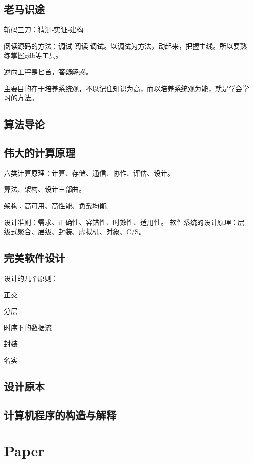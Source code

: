 \subsection{老马识途}

斩码三刀：猜测-实证-建构

阅读源码的方法：调试-阅读-调试。以调试为方法，动起来，把握主线。所以要熟练掌握gdb等工具。

逆向工程是匕首，答疑解惑。

主要目的在于培养系统观，不以记住知识为高，而以培养系统观为能，就是学会学习的方法。

\subsection{算法导论}

\subsection{伟大的计算原理}

六类计算原理：计算、存储、通信、协作、评估、设计。

算法、架构、设计三部曲。

架构：高可用、高性能、负载均衡。

设计准则：需求、正确性、容错性、时效性、适用性。
软件系统的设计原理：层级式聚合、层级、封装、虚拟机、对象、C/S。

\subsection{完美软件设计}

设计的几个原则：
\begin{enumbox}
\item 正交
\item 分层
\item 时序下的数据流
\item 封装
\item 名实
\end{enumbox}

\subsection{设计原本}

\subsection{计算机程序的构造与解释}

\section{Paper}

